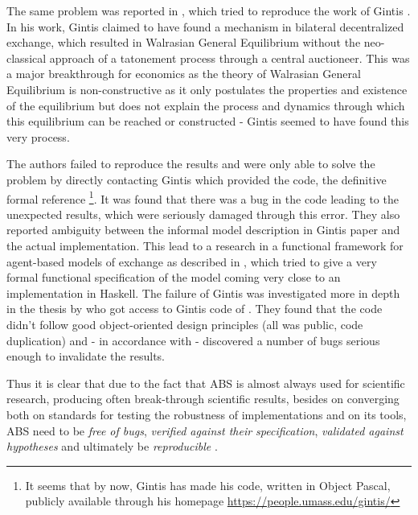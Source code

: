 The same problem was reported in \cite{ionescu_dependently-typed_2012}, which tried to reproduce the work of Gintis \cite{gintis_emergence_2006}. In his work, Gintis claimed to have found a mechanism in bilateral decentralized exchange, which resulted in Walrasian General Equilibrium without the neo-classical approach of a tatonement process through a central auctioneer. This was a major breakthrough for economics as the theory of Walrasian General Equilibrium is non-constructive as it only postulates the properties and existence of the equilibrium \cite{colell_microeconomic_1995} but does not explain the process and dynamics through which this equilibrium can be reached or constructed - Gintis seemed to have found this very process.

The authors \cite{ionescu_dependently-typed_2012} failed to reproduce the results and were only able to solve the problem by directly contacting Gintis which provided the code, the definitive formal reference \footnote{It seems that by now, Gintis has made his code, written in Object Pascal, publicly available through his homepage \url{https://people.umass.edu/gintis/}}. It was found that there was a bug in the code leading to the unexpected results, which were seriously damaged through this error. They also reported ambiguity between the informal model description in Gintis paper and the actual implementation.
This lead to a research in a functional framework for agent-based models of exchange as described in \cite{botta_functional_2011}, which tried to give a very formal functional specification of the model coming very close to an implementation in Haskell. The failure of Gintis was investigated more in depth in the thesis by \cite{evensen_extensible_2010} who got access to Gintis code of \cite{gintis_emergence_2006}. They found that the code didn't follow good object-oriented design principles (all was public, code duplication) and - in accordance with \cite{ionescu_dependently-typed_2012} - discovered a number of bugs serious enough to invalidate the results. 

Thus it is clear that due to the fact that ABS is almost always used for scientific research, producing often break-through scientific results, besides on converging both on standards for testing the robustness of implementations and on its tools, ABS need to be \textit{free of bugs}, \textit{verified against their specification}, \textit{validated against hypotheses} and ultimately be \textit{reproducible} \cite{axelrod_chapter_2006}.


